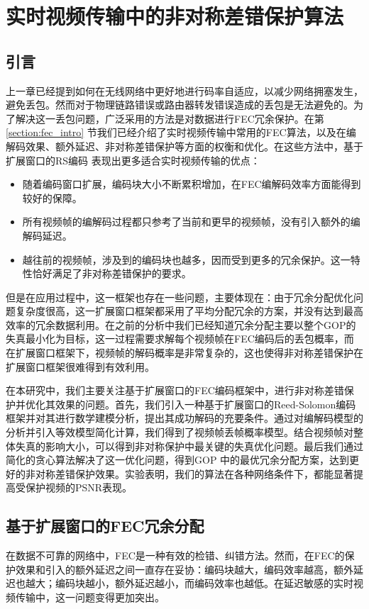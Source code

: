 \chapter{实时视频传输中的非对称差错保护算法}
\label{chap:fec}

\section{引言}
上一章已经提到如何在无线网络中更好地进行码率自适应，以减少网络拥塞发生，避免丢包。然而对于物理链路错误或路由器转发错误造成的丢包是无法避免的。为了解决这一丢包问题，广泛采用的方法是对数据进行FEC冗余保护。在第 \ref{section:fec_intro} 节我们已经介绍了实时视频传输中常用的FEC算法，以及在编解码效果、额外延迟、非对称差错保护等方面的权衡和优化。在这些方法中，基于扩展窗口的RS编码 \cite{sejdinovic2009expanding} 表现出更多适合实时视频传输的优点：
\begin{itemize}
    \item 随着编码窗口扩展，编码块大小不断累积增加，在FEC编解码效率方面能得到较好的保障。
    \item 所有视频帧的编解码过程都只参考了当前和更早的视频帧，没有引入额外的编解码延迟。
    \item 越往前的视频帧，涉及到的编码块也越多，因而受到更多的冗余保护。这一特性恰好满足了非对称差错保护的要求。
\end{itemize}

但是在应用过程中，这一框架也存在一些问题，主要体现在：由于冗余分配优化问题复杂度很高，这一扩展窗口框架都采用了平均分配冗余的方案，并没有达到最高效率的冗余数据利用。在之前的分析中我们已经知道冗余分配主要以整个GOP的失真最小化为目标，这一过程需要求解每个视频帧在FEC编码后的丢包概率，而在扩展窗口框架下，视频帧的解码概率是非常复杂的，这也使得非对称差错保护在扩展窗口框架很难得到有效利用。

在本研究中，我们主要关注基于扩展窗口的FEC编码框架中，进行非对称差错保护并优化其效果的问题。首先，我们引入一种基于扩展窗口的Reed-Solomon编码框架并对其进行数学建模分析，提出其成功解码的充要条件。通过对编解码模型的分析并引入等效模型简化计算，我们得到了视频帧丢帧概率模型。结合视频帧对整体失真的影响大小，可以得到非对称保护中最关键的失真优化问题。最后我们通过简化的贪心算法解决了这一优化问题，得到GOP 中的最优冗余分配方案，达到更好的非对称差错保护效果。实验表明，我们的算法在各种网络条件下，都能显著提高受保护视频的PSNR表现。


\section{基于扩展窗口的FEC冗余分配}
在数据不可靠的网络中，FEC是一种有效的检错、纠错方法。然而，在FEC的保护效果和引入的额外延迟之间一直存在妥协：编码块越大，编码效率越高，额外延迟也越大；编码块越小，额外延迟越小，而编码效率也越低。在延迟敏感的实时视频传输中，这一问题变得更加突出。

